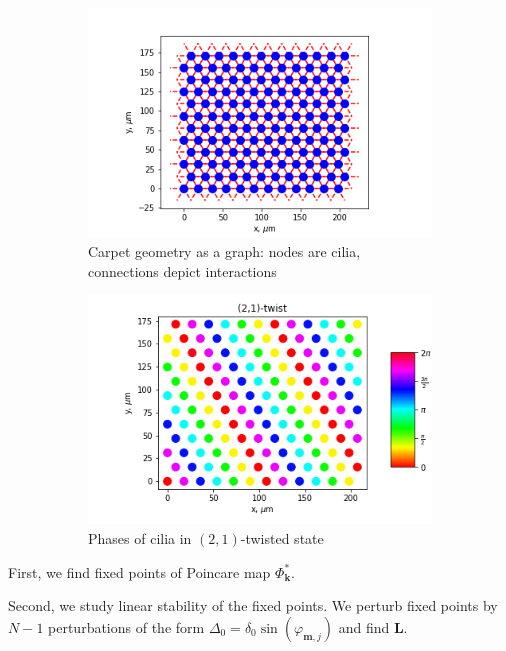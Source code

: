 \documentclass[a4paper,12pt]{article}
\renewcommand*{\vec}[1]{\mathbf{#1}}
\newcommand*{\FP}{\Phi^*}%
\newcommand*{\Lmat}{\mathbf{L}}  %
\begin{document}
\begin{figure}[h]
\begin{subfigure}[h]{.55\textwidth}
  \centering
 \includegraphics[width=.9\textwidth]{assets/theory-2019-09-05-115736205-2a1.png}
  \caption{Carpet geometry as a graph: nodes are cilia, connections depict interactions}
\end{subfigure}
\begin{subfigure}[h]{.55\textwidth}
  \centering
  \includegraphics[width=.9\textwidth]{assets/theory-2019-09-05-120537244-7e6.png}
  \caption{Phases of cilia in $(2,1)$-twisted state}
\end{subfigure}
\caption{}
 \label{fig:12-geom}
\end{figure}

First, we find fixed points of Poincare map $\FP_{\vec{k}}$. 

Second, we study linear stability of the fixed points. We perturb fixed points by $N-1$ perturbations of the form $\Delta_0 = \delta_0 \sin(\varphi_{\vec{m},j})$ and find $\Lmat$.
\end{document}
